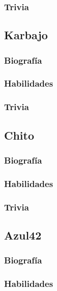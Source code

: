 \documentclass[letterpaper]{article}
\begin{document}
\subsubsection{Trivia}


\subsection{Karbajo}

\subsubsection{Biografía}

\subsubsection{Habilidades}

\subsubsection{Trivia}

\subsection{Chito}

\subsubsection{Biografía}

\subsubsection{Habilidades}

\subsubsection{Trivia}
\subsection{Azul42}

\subsubsection{Biografía}

\subsubsection{Habilidades}
\end{document}
